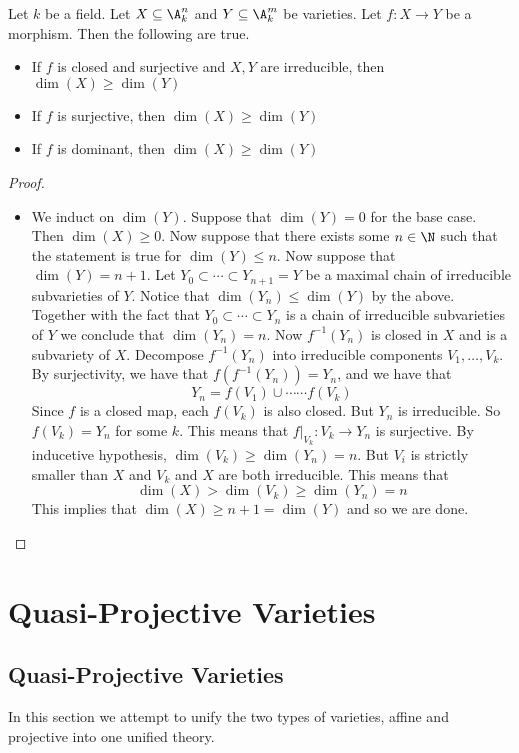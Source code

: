 \documentclass[a4paper]{article}
\begin{document}
\begin{prp}{}{} Let $k$ be a field. Let $X\subseteq\A_k^n$ and $Y\subseteq\A_k^m$ be varieties. Let $f:X\to Y$ be a morphism. Then the following are true. 
\begin{itemize}
\item If $f$ is closed and surjective and $X,Y$ are irreducible, then $\dim(X)\geq\dim(Y)$
\item If $f$ is surjective, then $\dim(X)\geq\dim(Y)$
\item If $f$ is dominant, then $\dim(X)\geq\dim(Y)$
\end{itemize} \tcbline
\begin{proof}~\\
\begin{itemize}
\item We induct on $\dim(Y)$. Suppose that $\dim(Y)=0$ for the base case. Then $\dim(X)\geq 0$. Now suppose that there exists some $n\in\N$ such that the statement is true for $\dim(Y)\leq n$. Now suppose that $\dim(Y)=n+1$. Let $Y_0\subset\cdots\subset Y_{n+1}=Y$ be a maximal chain of irreducible subvarieties of $Y$. Notice that $\dim(Y_n)\leq\dim(Y)$ by the above. Together with the fact that $Y_0\subset\cdots\subset Y_n$ is a chain of irreducible subvarieties of $Y$ we conclude that $\dim(Y_n)=n$. Now $f^{-1}(Y_n)$ is closed in $X$ and is a subvariety of $X$. Decompose $f^{-1}(Y_n)$ into irreducible components $V_1,\dots,V_k$. By surjectivity, we have that $f(f^{-1}(Y_n))=Y_n$, and we have that $$Y_n=f(V_1)\cup\cdots\cdots f(V_k)$$ Since $f$ is a closed map, each $f(V_k)$ is also closed. But $Y_n$ is irreducible. So $f(V_k)=Y_n$ for some $k$. This means that $f|_{V_k}:V_k\to Y_n$ is surjective. By inducetive hypothesis, $\dim(V_k)\geq\dim(Y_n)=n$. But $V_i$ is strictly smaller than $X$ and $V_k$ and $X$ are both irreducible. This means that $$\dim(X)>\dim(V_k)\geq\dim(Y_n)=n$$ This implies that $\dim(X)\geq n+1=\dim(Y)$ and so we are done. 
\end{itemize}
\end{proof}
\end{prp}

\pagebreak
\section{Quasi-Projective Varieties}
\subsection{Quasi-Projective Varieties}
In this section we attempt to unify the two types of varieties, affine and projective into one unified theory. 
\end{document}
